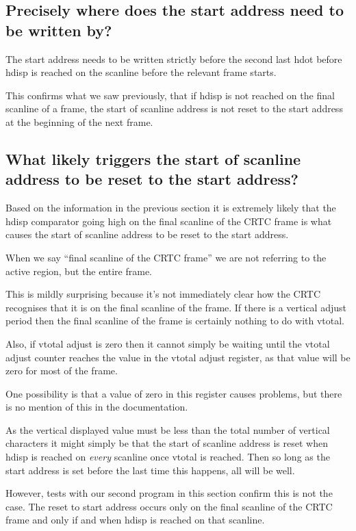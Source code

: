 \documentclass[a4paper,10pt]{amsart}
\begin{document}
\subsection{Precisely where does the start address need to be written by?}

The start address needs to be written strictly before the second last hdot
before hdisp is reached on the scanline before the relevant frame starts.

This confirms what we saw previously, that if hdisp is not reached on the
final scanline of a frame, the start of scanline address is not reset to the
start address at the beginning of the next frame.

\subsection{What likely triggers the start of scanline address to be reset to
the start address?}

Based on the information in the previous section it is extremely likely that
the hdisp comparator going high on the final scanline of the CRTC frame is
what causes the start of scanline address to be reset to the start address.

When we say ``final scanline of the CRTC frame'' we are not referring to the
active region, but the entire frame.

This is mildly surprising because it's not immediately clear how the CRTC
recognises that it is on the final scanline of the frame. If there is a
vertical adjust period then the final scanline of the frame is certainly
nothing to do with vtotal.

Also, if vtotal adjust is zero then it cannot simply be waiting until the
vtotal adjust counter reaches the value in the vtotal adjust register, as that
value will be zero for most of the frame.

One possibility is that a value of zero in this register causes problems, but
there is no mention of this in the documentation.

As the vertical displayed value must be less than the total number of vertical
characters it might simply be that the start of scanline address is reset
when hdisp is reached on \emph{every} scanline once vtotal is reached. Then
so long as the start address is set before the last time this happens, all
will be well.

However, tests with our second program in this section confirm this is not the
case. The reset to start address occurs only on the final scanline of the CRTC
frame and only if and when hdisp is reached on that scanline.
\end{document}
